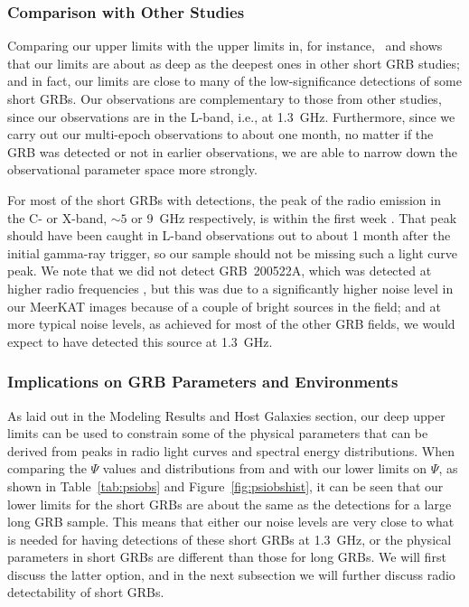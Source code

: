 \documentclass[12pt]{article}
\begin{document}
\subsubsection{Comparison with Other Studies}
Comparing our upper limits with the upper limits in, for instance,~\citet{2015ApJ...815..102F} and \citet{2021ApJ...906..127F} shows that our limits are about as deep as the deepest ones in other short GRB studies; and in fact, our limits are close to many of the low-significance detections of some short GRBs. Our observations are complementary to those from other studies, since our observations are in the L-band, i.e., at 1.3~GHz. Furthermore, since we carry out our multi-epoch observations to about one month, no matter if the GRB was detected or not in earlier observations, we are able to narrow down the observational parameter space more strongly.

For most of the short GRBs with detections, the peak of the radio emission in the C- or X-band, $\sim5$ or 9~GHz respectively, is within the first week \citep{2021ApJ...906..127F}. That peak should have been caught in L-band observations out to about 1 month after the initial gamma-ray trigger, so our sample should not be missing such a light curve peak. We note that we did not detect GRB~200522A, which was detected at higher radio frequencies \citep{2021ApJ...906..127F}, but this was due to a significantly higher noise level in our MeerKAT images because of a couple of bright sources in the field; and at more typical noise levels, as achieved for most of the other GRB fields, we would expect to have detected this source at 1.3~GHz.


\subsubsection{Implications on GRB Parameters and Environments}

As laid out in the Modeling Results and Host Galaxies section, our deep upper limits can be used to constrain some of the physical parameters that can be derived from peaks in radio light curves and spectral energy distributions. When comparing the $\Psi$ values and distributions from \citet{2017MNRAS.472.3161B} and \citet{2023MNRAS.518.1522D} with our lower limits on $\Psi$, as shown in Table~\ref{tab:psiobs} and Figure~\ref{fig:psiobshist}, it can be seen that our lower limits for the short GRBs are about the same as the detections for a large long GRB sample. This means that either our noise levels are very close to what is needed for having detections of these short GRBs at 1.3~GHz, or the physical parameters in short GRBs are different than those for long GRBs. We will first discuss the latter option, and in the next subsection we will further discuss radio detectability of short GRBs.
\end{document}
